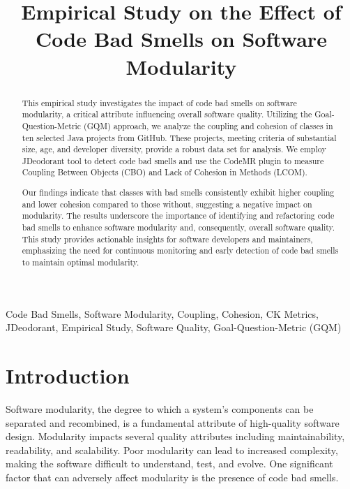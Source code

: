 \documentclass[conference]{IEEEtran}
\begin{document}
	
	\title{Empirical Study on the Effect of Code Bad Smells on Software Modularity}
	\author{
		\and
		}
	
	\maketitle
	
	\begin{abstract}
        This empirical study investigates the impact of code bad smells on software modularity, a critical attribute influencing overall software quality. Utilizing the Goal-Question-Metric (GQM) approach, we analyze the coupling and cohesion of classes in ten selected Java projects from GitHub. These projects, meeting criteria of substantial size, age, and developer diversity, provide a robust data set for analysis. We employ JDeodorant tool to detect code bad smells and use the CodeMR plugin to measure Coupling Between Objects (CBO) and Lack of Cohesion in Methods (LCOM).
        
        Our findings indicate that classes with bad smells consistently exhibit higher coupling and lower cohesion compared to those without, suggesting a negative impact on modularity. The results underscore the importance of identifying and refactoring code bad smells to enhance software modularity and, consequently, overall software quality. This study provides actionable insights for software developers and maintainers, emphasizing the need for continuous monitoring and early detection of code bad smells to maintain optimal modularity.
	\end{abstract}
	
	\begin{IEEEkeywords}
		Code Bad Smells, Software Modularity, Coupling, Cohesion, CK Metrics, JDeodorant, Empirical Study, Software Quality, Goal-Question-Metric (GQM)
	\end{IEEEkeywords}
	
	\section{Introduction}
        Software modularity, the degree to which a system's components can be separated and recombined, is a fundamental attribute of high-quality software design. Modularity impacts several quality attributes including maintainability, readability, and scalability. Poor modularity can lead to increased complexity, making the software difficult to understand, test, and evolve. One significant factor that can adversely affect modularity is the presence of code bad smells.
        
\end{document}
